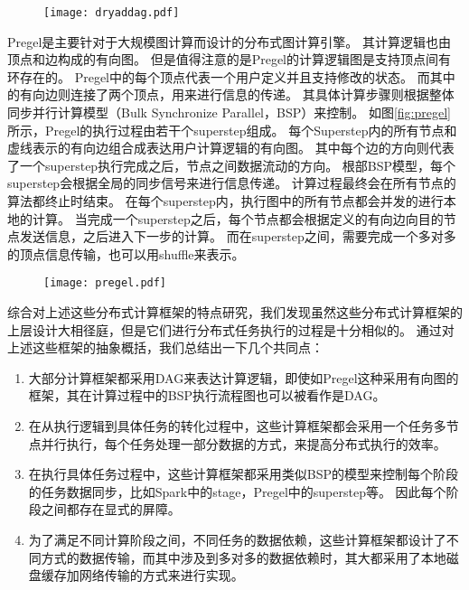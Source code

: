 \begin{figure}[!htp]
    \centering
    \texttt{[image: dryaddag.pdf]}
\end{figure}

Pregel\cite{pregel}是主要针对于大规模图计算而设计的分布式图计算引擎。
其计算逻辑也由顶点和边构成的有向图。
但是值得注意的是Pregel的计算逻辑图是支持顶点间有环存在的。
Pregel中的每个顶点代表一个用户定义并且支持修改的状态。
而其中的有向边则连接了两个顶点，用来进行信息的传递。
其具体计算步骤则根据整体同步并行计算模型（Bulk Synchronize Parallel，BSP）来控制。
如图\ref{fig:pregel}所示，Pregel的执行过程由若干个superstep组成。
每个Superstep内的所有节点和虚线表示的有向边组合成表达用户计算逻辑的有向图。
其中每个边的方向则代表了一个superstep执行完成之后，节点之间数据流动的方向。
根部BSP模型，每个superstep会根据全局的同步信号来进行信息传递。
计算过程最终会在所有节点的算法都终止时结束。
在每个superstep内，执行图中的所有节点都会并发的进行本地的计算。
当完成一个superstep之后，每个节点都会根据定义的有向边向目的节点发送信息，之后进入下一步的计算。
而在superstep之间，需要完成一个多对多的顶点信息传输，也可以用shuffle来表示。

\begin{figure}[!htp]
    \centering
    \texttt{[image: pregel.pdf]}
\end{figure}

综合对上述这些分布式计算框架的特点研究，我们发现虽然这些分布式计算框架的上层设计大相径庭，但是它们进行分布式任务执行的过程是十分相似的。
通过对上述这些框架的抽象概括，我们总结出一下几个共同点：

\begin{enumerate}
	\item 大部分计算框架都采用DAG来表达计算逻辑，即使如Pregel这种采用有向图的框架，其在计算过程中的BSP执行流程图也可以被看作是DAG。
	\item 在从执行逻辑到具体任务的转化过程中，这些计算框架都会采用一个任务多节点并行执行，每个任务处理一部分数据的方式，来提高分布式执行的效率。
	\item 在执行具体任务过程中，这些计算框架都采用类似BSP的模型来控制每个阶段的任务数据同步，比如Spark中的stage，Pregel中的superstep等。
	因此每个阶段之间都存在显式的屏障。
	\item 为了满足不同计算阶段之间，不同任务的数据依赖，这些计算框架都设计了不同方式的数据传输，而其中涉及到多对多的数据依赖时，其大都采用了本地磁盘缓存加网络传输的方式来进行实现。 
\end{enumerate}

